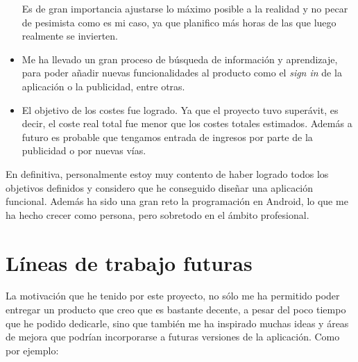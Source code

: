 \begin{itemize}
	Es de gran importancia ajustarse lo máximo posible a la realidad y no pecar de pesimista como es mi caso, ya que planifico más horas de las que luego realmente se invierten.
	
	\item Me ha llevado un gran proceso de búsqueda de información y aprendizaje, para poder añadir nuevas funcionalidades al producto como el \emph{sign in} de la aplicación o la publicidad, entre otras.
	
	\item El objetivo de los costes fue logrado. Ya que el proyecto tuvo superávit, es decir, el coste real total fue menor que los costes totales estimados. Además a futuro es probable que tengamos entrada de ingresos por parte de la publicidad o por nuevas vías.
	
\end{itemize}

En definitiva, personalmente estoy muy contento de haber logrado todos los objetivos definidos y considero que he conseguido diseñar una aplicación funcional. Además ha sido una gran reto la programación en Android, lo que me ha hecho crecer como persona, pero sobretodo en el ámbito profesional.


\section{Líneas de trabajo futuras}
La motivación que he tenido por este proyecto, no sólo me ha permitido poder entregar un producto que creo que es bastante decente, a pesar del poco tiempo que he podido dedicarle, sino que también me ha inspirado muchas ideas y áreas de mejora que podrían incorporarse a futuras versiones de la aplicación. Como por ejemplo:

